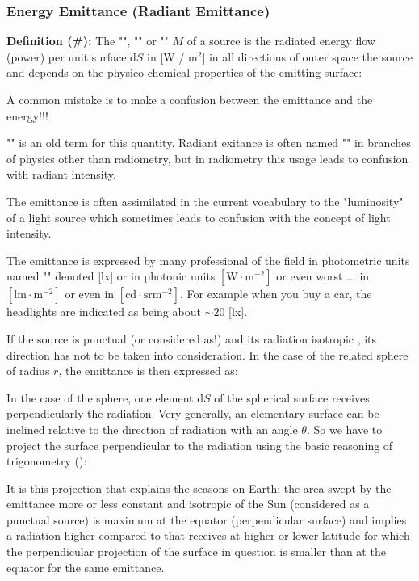 	\subsubsection{Energy Emittance (Radiant Emittance)} \label{radiant emittance}
	\textbf{Definition (\#\mydef):} The "", "" or "" $M$ of a source is the radiated energy flow (power) per unit surface $\mathrm{d}S$ in [W / m${}^2$] in all directions of outer space the source and depends on the physico-chemical properties of the emitting surface:
	
	A common mistake is to make a confusion between the emittance and the energy!!!
	\begin{tcolorbox}[title=Remark,colframe=black,arc=10pt]
	"" is an old term for this quantity. Radiant exitance is often named "" in branches of physics other than radiometry, but in radiometry this usage leads to confusion with radiant intensity.
	\end{tcolorbox}	
	The emittance is often assimilated in the current vocabulary to the "luminosity" of a light source which sometimes leads to confusion with the concept of light intensity.
	
	The emittance is expressed by many professional of the field in photometric units named "" denoted [lx] or in photonic units $[\text{W}\cdot\text{m}^{-2}]$ or even worst ... in $[\text{lm}\cdot \text{m}^{-2}]$ or even in $[\text{cd}\cdot \text{sr} \text{m}^{-2}]$. For example when you buy a car, the headlights are indicated as being about $\sim 20$ [lx].
	
	If the source is punctual (or considered as!) and its radiation isotropic , its direction has not to be taken into consideration. In the case of the related sphere of radius $r$, the emittance is then expressed as:
	
	In the case of the sphere, one element $\mathrm{d}S$ of the spherical surface receives perpendicularly the radiation. Very generally, an elementary surface can be inclined relative to the direction of radiation with an angle $\theta$.\label{surface projection emittence} So we have to project the surface perpendicular to the radiation using the basic reasoning of trigonometry ():
	
	It is this projection that explains the seasons on Earth: the area swept by the emittance more or less constant and isotropic of the Sun (considered as a punctual source) is maximum at the equator (perpendicular surface) and implies a radiation higher compared to that receives at higher or lower latitude for which the perpendicular projection of the surface in question is smaller than at the equator for the same emittance.
	
